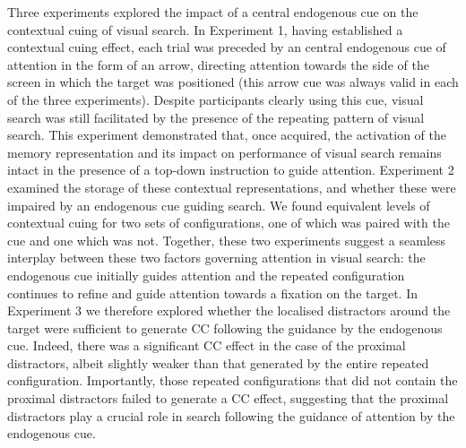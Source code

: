 \documentclass[
  man,floatsintext]{apa7}
\begin{document}
Three experiments explored the impact of a central endogenous cue on the contextual cuing of visual search. In Experiment 1, having established a contextual cuing effect, each trial was preceded by an central endogenous cue of attention in the form of an arrow, directing attention towards the side of the screen in which the target was positioned (this arrow cue was always valid in each of the three experiments). Despite participants clearly using this cue, visual search was still facilitated by the presence of the repeating pattern of visual search. This experiment demonstrated that, once acquired, the activation of the memory representation and its impact on performance of visual search remains intact in the presence of a top-down instruction to guide attention. Experiment 2 examined the storage of these contextual representations, and whether these were impaired by an endogenous cue guiding search. We found equivalent levels of contextual cuing for two sets of configurations, one of which was paired with the cue and one which was not. Together, these two experiments suggest a seamless interplay between these two factors governing attention in visual search: the endogenous cue initially guides attention and the repeated configuration continues to refine and guide attention towards a fixation on the target. In Experiment 3 we therefore explored whether the localised distractors around the target were sufficient to generate CC following the guidance by the endogenous cue. Indeed, there was a significant CC effect in the case of the proximal distractors, albeit slightly weaker than that generated by the entire repeated configuration. Importantly, those repeated configurations that did not contain the proximal distractors failed to generate a CC effect, suggesting that the proximal distractors play a crucial role in search following the guidance of attention by the endogenous cue.
\end{document}
